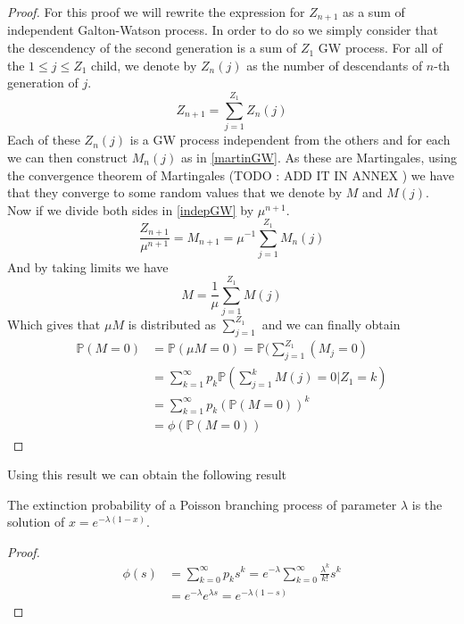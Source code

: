 \begin{proof}
	For this proof we will rewrite the expression for $Z_{n+1}$ as a sum of independent Galton-Watson process. 
	In order to do so we simply consider that the descendency of the second generation is a sum of $Z_1$ GW process.
	For all of the $1 \leq j \leq Z_1$ child, we denote by $Z_n(j)$ as the number of descendants of $n$-th generation of $j$.
	\begin{equation}\label{indepGW}
		Z_{n+1} = \sum_{j=1}^{Z_1} Z_n(j)
	\end{equation}
	Each of these $Z_n(j)$ is a GW process independent from the others and for each we can then construct $M_n(j)$ as in \ref{martinGW}.
	As these are Martingales, using the convergence theorem of Martingales (TODO : ADD IT IN ANNEX ) we have that they converge to some random values that we denote by $M$ and $M(j)$.
	Now if we divide both sides in \ref{indepGW} by $\mu^{n+1}$.
	\begin{equation}
		\frac{Z_{n+1}}{\mu^{n+1}} = M_{n+1} = \mu^{-1} \sum_{j=1}^{Z_1} M_n(j)
	\end{equation}
	And by taking limits we have
	\begin{equation}
		M = \frac{1}{\mu} \sum_{j=1}^{Z_1}M(j)
	\end{equation}
	Which gives that $\mu M$ is distributed as $\sum_{j=1}^{Z_1}$ and we can finally obtain
	\begin{align}
		\mathbb{P}(M = 0) 	&= \mathbb{P}(\mu M = 0) = \mathbb{P}(\sum_{j=1}^{Z_1}(M_j = 0) \\
					&= \sum_{k=1}^{\infty} p_k \mathbb{P}(\sum_{j=1}^{k} M(j) = 0 | Z_1 = k) \\
					&= \sum_{k=1}^{\infty} p_k (\mathbb{P}(M=0))^k\\
					&= \phi(\mathbb{P}(M=0))
	\end{align}
\end{proof}
Using this result we can obtain the following result
\begin{theorem}
	The extinction probability of a Poisson branching process of parameter $\lambda$ is the solution of $x = e^{-\lambda(1-x)}$.
\end{theorem}
\begin{proof}
	\begin{align}
		\phi(s) &= \sum_{k=0}^{\infty} p_k s^k = e^{-\lambda} \sum_{k=0}^{\infty} \frac{\lambda ^k}{k!} s^k\\
			&= e^{-\lambda}e^{\lambda s} = e^{-\lambda(1 -s)}
	\end{align}
\end{proof}


